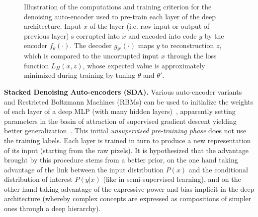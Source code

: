 \documentclass{article} %
\begin{document}
\begin{figure}[htb]
\centerline{}
\caption{Illustration of the computations and training criterion for the denoising
auto-encoder used to pre-train each layer of the deep architecture. Input $x$ of
the layer (i.e. raw input or output of previous layer)
s corrupted into $\tilde{x}$ and encoded into code $y$ by the encoder $f_\theta(\cdot)$.
The decoder $g_{\theta'}(\cdot)$ maps $y$ to reconstruction $z$, which
is compared to the uncorrupted input $x$ through the loss function
$L_H(x,z)$, whose expected value is approximately minimized during training
by tuning $\theta$ and $\theta'$.}
\label{fig:da}
\end{figure}


{\bf Stacked Denoising Auto-encoders (SDA).}
Various auto-encoder variants and Restricted Boltzmann Machines (RBMs)
can be used to initialize the weights of each layer of a deep MLP (with many hidden 
layers)~\citep{Hinton06,ranzato-07-small,Bengio-nips-2006}, 
apparently setting parameters in the
basin of attraction of supervised gradient descent yielding better 
generalization~\citep{Erhan+al-2010}. 
This initial {\em unsupervised
pre-training phase} does not use the training labels.
Each layer is trained in turn to produce a new representation of its input
(starting from the raw pixels).
It is hypothesized that the
advantage brought by this procedure stems from a better prior,
on the one hand taking advantage of the link between the input
distribution $P(x)$ and the conditional distribution of interest
$P(y|x)$ (like in semi-supervised learning), and on the other hand
taking advantage of the expressive power and bias implicit in the
deep architecture (whereby complex concepts are expressed as
compositions of simpler ones through a deep hierarchy).
\end{document}
